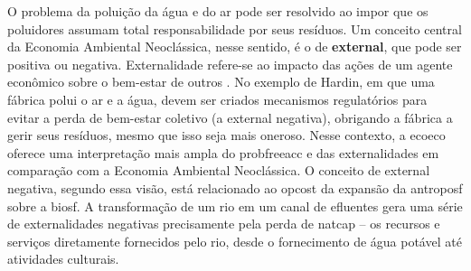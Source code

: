 \documentclass[./main.tex]{subfiles}
\begin{document}
\noindent O problema da poluição da água e do ar pode ser resolvido ao impor que os poluidores assumam total responsabilidade por seus resíduos. Um conceito central da Economia Ambiental Neoclássica, nesse sentido, é o de \textbf{\gls{external}}, que pode ser positiva ou negativa. Externalidade refere-se ao impacto das ações de um agente econômico sobre o bem-estar de outros \cite{Mankiw2002a}. No exemplo de Hardin, em que uma fábrica polui o ar e a água, devem ser criados mecanismos regulatórios para evitar a perda de bem-estar coletivo (a \gls{external} negativa), obrigando a fábrica a gerir seus resíduos, mesmo que isso seja mais oneroso. Nesse contexto, a \gls{ecoeco} oferece uma interpretação mais ampla do \gls{probfreeacc} e das externalidades em comparação com a Economia Ambiental Neoclássica. O conceito de \gls{external} negativa, segundo essa visão, está relacionado ao \gls{opcost} da expansão da \gls{antroposf} sobre a \gls{biosf}. A transformação de um rio em um canal de efluentes gera uma série de externalidades negativas precisamente pela perda de \gls{natcap} -- os recursos e serviços diretamente fornecidos pelo rio, desde o fornecimento de água potável até atividades culturais. 
\end{document}
